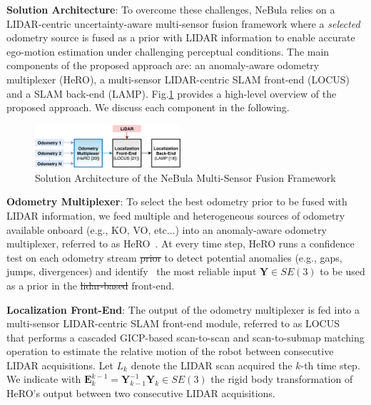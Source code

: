 \documentclass[letterpaper, 10pt, conference]{ieeeconf}      %
\newcommand{\ph}[1]{{\textbf{#1}:}} %
\newcommand{\rev}[1]{{\color{blue}#1}} %
\begin{document}
\ph{Solution Architecture} To overcome these challenges, NeBula relies on a LIDAR-centric uncertainty-aware multi-sensor fusion framework where a \emph{selected} odometry source is fused as a prior with LIDAR information to enable accurate ego-motion estimation under challenging perceptual conditions. The main components of the proposed approach are:  an anomaly-aware odometry multiplexer (HeRO),  a multi-sensor LIDAR-centric SLAM front-end (LOCUS) and  a SLAM back-end (LAMP). Fig.\ref{architecture} provides a high-level overview of the proposed approach. We discuss each component in the following.

\begin{figure}[thpb]
  \centering
  \includegraphics[width=0.48\textwidth]{spot_iros/graphics/architecture.pdf}
  \caption{\rev{Solution Architecture of the NeBula Multi-Sensor Fusion Framework}}
  \label{architecture}
\end{figure}



\ph{Odometry Multiplexer} To select the best odometry prior to be fused with LIDAR information, we feed multiple and heterogeneous sources of odometry available onboard (e.g., KO, VO, etc...) into an anomaly-aware odometry multiplexer, referred to as HeRO~\cite{Santamaria-navarro2019}. At every time step, HeRO runs a confidence test on each odometry \rev{stream \st{prior}} to detect potential anomalies %
(e.g., gaps, jumps, divergences) and identify~\cite{Santamaria-navarro2019} the most reliable input $\textbf{Y} \in SE(3)$ to be used as a prior in the \rev{\rev{LIDAR} \st{lidar-based}} front-end.



\ph{Localization Front-End} The output of the odometry multiplexer is fed into a multi-sensor LIDAR-centric SLAM front-end module, referred to as LOCUS~\cite{Palieri2020} that performs a cascaded GICP-based scan-to-scan and scan-to-submap matching operation to estimate the relative motion of the robot between consecutive LIDAR acquisitions. Let $L_{k}$ denote the \rev{LIDAR} scan acquired the $k$-th time step. We indicate with $\textbf{E}^{k-1}_{k} = \textbf{Y}^{-1}_{k-1}\textbf{Y}_k\in SE(3)$ the rigid body transformation of HeRO's output between two consecutive LIDAR acquisitions. %
\end{document}
